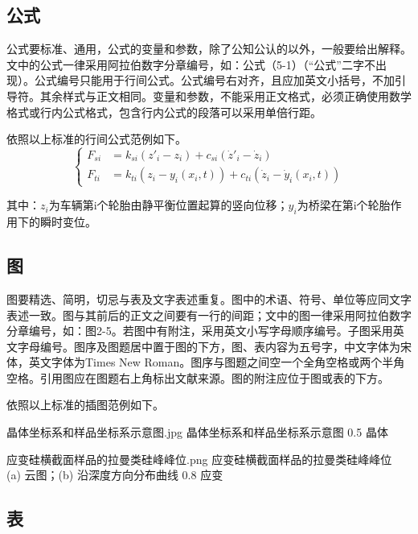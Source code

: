 \subsection{公式}

公式要标准、通用，公式的变量和参数，除了公知公认的以外，一般要给出解释。文中的公式一律采用阿拉伯数字分章编号，如：公式（5-1）（“公式”二字不出现）。公式编号只能用于行间公式。公式编号右对齐，且应加英文小括号，不加引导符。其余样式与正文相同。变量和参数，不能采用正文格式，必须正确使用数学格式或行内公式格式，包含行内公式的段落可以采用单倍行距。

依照以上标准的行间公式范例如下。
\begin{equation}
    \begin{cases}
        F_{si} &= k_{si}(z'_i-z_i)+c_{si}(\dot{z}'_i-\dot{z}_i) \\
        F_{ti} &= k_{ti}(z_i-y_i(x_i,t))+c_{ti}(\dot{z}_i-\dot{y}_i(x_i,t))
    \end{cases}
    \label{equ:\theequation}
\end{equation}

其中：$z_i$为车辆第i个轮胎由静平衡位置起算的竖向位移；$y_i$为桥梁在第i个轮胎作用下的瞬时变位。

\subsection{图}

图要精选、简明，切忌与表及文字表述重复。图中的术语、符号、单位等应同文字表述一致。图与其前后的正文之间要有一行的间距；文中的图一律采用阿拉伯数字分章编号，如：图2-5。若图中有附注，采用英文小写字母顺序编号。子图采用英文字母编号。图序及图题居中置于图的下方，图、表内容为五号字，中文字体为宋体，英文字体为Times New Roman。图序与图题之间空一个全角空格或两个半角空格。引用图应在图题右上角标出文献来源。图的附注应位于图或表的下方。

依照以上标准的插图范例如下。

            {晶体坐标系和样品坐标系示意图.jpg}
            {晶体坐标系和样品坐标系示意图}
            {0.5}
            {晶体}

            {应变硅横截面样品的拉曼类硅峰峰位.png}
            {应变硅横截面样品的拉曼类硅峰峰位 \\ (a)  云图；(b)  沿深度方向分布曲线}
            {0.8}
            {应变}

\subsection{表}

